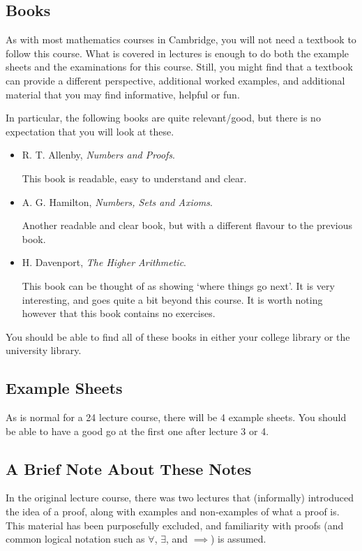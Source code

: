 \documentclass[a4]{scrartcl}
\begin{document}
\subsection{Books}

As with most mathematics courses in Cambridge, you will not need a textbook to follow this course. What is covered in lectures is enough to do both the example sheets and the examinations for this course. Still, you might find that a textbook can provide a different perspective, additional worked examples, and additional material that you may find informative, helpful or fun.

In particular, the following books are quite relevant/good, but there is no expectation that you will look at these.

\begin{itemize}
	\item R. T. Allenby, \emph{Numbers and Proofs}.
	
	This book is readable, easy to understand and clear.

	\item A. G. Hamilton, \emph{Numbers, Sets and Axioms}.
	
	Another readable and clear book, but with a different flavour to the previous book.

	\item H. Davenport, \emph{The Higher Arithmetic}.

	This book can be thought of as showing `where things go next'. It is very interesting, and goes quite a bit beyond this course. It is worth noting however that this book contains no exercises.
\end{itemize}

You should be able to find all of these books in either your college library or the university library.

\subsection{Example Sheets}

As is normal for a 24 lecture course, there will be 4 example sheets. You should be able to have a good go at the first one after lecture 3 or 4.

\subsection{A Brief Note About These Notes}

In the original lecture course, there was two lectures that (informally) introduced the idea of a proof, along with examples and non-examples of what a proof is. This material has been purposefully excluded, and familiarity with proofs (and common logical notation such as $\forall$, $\exists$, and $\implies$) is assumed. 
\end{document}
